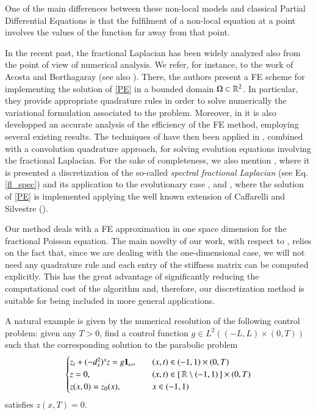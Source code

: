 One of the main differences between these non-local models and classical Partial Differential Equations is that the fulfilment of a non-local equation at a point involves the values of the function far away from that point.

In the recent past, the fractional Laplacian has been widely analyzed also from the point of view of numerical analysis. We refer, for instance, to the work \cite{acosta2017fractional} of Acosta and Borthagaray (see also \cite{acosta2017short}). There, the authors present a FE scheme for implementing the solution of \eqref{PE} in a bounded domain $\Omega\subset\mathbb{R}^2$. In particular, they provide appropriate quadrature rules in order to solve numerically the variational formulation associated to the problem. Moreover, in \cite{acosta2017fractional} it is also developped an accurate analysis of the efficiency of the FE method, employing several existing results. The techniques of \cite{acosta2017short,acosta2017fractional} have then been applied in \cite{acosta2017finite}, combined with a convolution quadrature approach, for solving evolution equations involving the fractional Laplacian. For the sake of completeness, we also mention \cite{bonito2015numerical}, where it is presented a discretization of the so-called \textit{spectral fractional Laplacian} (see Eq. \eqref{fl_spec}) and its application to the evolutionary case \cite{bonito2017approximation}, and \cite{nochetto2015pde}, where the solution of \eqref{PE} is implemented applying the well known extension of Caffarelli and Silvestre (\cite{caffarelli2007extension}).   

Our method deals with a FE approximation in one space dimension for the fractional Poisson equation. The main novelty of our work, with respect to \cite{acosta2017short,acosta2017fractional}, relies on the fact that, since we are dealing with the one-dimensional case, we will not need any quadrature rule and each entry of the stiffness matrix can be computed explicitly. This has the great advantage of significantly reducing the computational cost of the algorithm and, therefore, our discretization method is suitable for being included in more general applications.  

A natural example is given by the numerical resolution of the following control problem: given any $T>0$, find a control function $g\in L^2((-L,L)\times(0,T))$ such that the corresponding solution to the parabolic problem 
\begin{align}\label{heat_frac}
	\begin{cases}
		z_t + (-d_x^2)^{s}z = g\mathbf{1}_{\omega},\quad & (x,t)\in (-1,1)\times(0,T)
		\\
		z=0, & (x,t)\in[\,\mathbb{R}\setminus (-1,1)\,]\times(0,T)
		\\
		z(x,0)=z_0(x), & x\in (-1,1)
	\end{cases}
\end{align} 
satisfies $z(x,T)=0$. 

